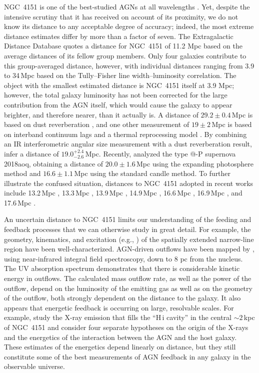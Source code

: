 \documentclass[twocolumn]{aastex63}
\makeatletter
\renewcommand{\ng}{NGC\ 4151 }
\newcommand*{\rom}[1]{\expandafter\@slowromancap\romannumeral #1@}
\makeatother
\begin{document}
\ng is  one of the best-studied AGNs at all wavelengths \citep[e.g.,][]{Ulrich2000}. Yet, despite the intensive scrutiny that it has received on account of its proximity, we do not know its distance to any acceptable degree of accuracy; indeed, the most extreme distance estimates differ by more than a factor of seven. The Extragalactic Distance Database \citep{Tully2009} quotes a distance for \ng of 11.2 Mpc based on the average distances of its fellow group members. Only four galaxies contribute to this group-averaged distance, however, with individual distances ranging from 3.9 to 34\,Mpc based on the Tully--Fisher line width--luminosity correlation. The object with the smallest estimated distance is \ng itself at 3.9 Mpc; however, the total galaxy luminosity has not been corrected for the large contribution from the AGN itself, which would cause the galaxy to appear brighter, and therefore nearer, than it actually is. A distance of $29.2 \pm 0.4$\,Mpc is based on dust reverberation \citep{Yoshii2014}, and one other measurement of $19 \pm 2$\,Mpc is based on interband continuum lags and a thermal reprocessing model \citep{Cackett2007}. By combining an IR interferometric angular size measurement with a dust reverberation result, \cite{Hoenig2014} infer a distance of $19.0^{+2.4}_{-2.6}$\,Mpc. Recently, \citet{2019MNRAS.487.3001T} analyzed the type \rom{2}-P supernova 2018aoq, obtaining a distance of $20.0\pm1.6$\,Mpc using the expanding photosphere method and $16.6\pm1.1$\,Mpc using the standard candle method. To further illustrate the confused situation, distances to \ng adopted in recent works include 13.2\,Mpc \citep{Hicks2008}, 13.3\,Mpc \citep{Storchi-Bergmann2010, Iserlohe2013}, 13.9\,Mpc \citep{Onken2014,DeRosa2018}, 14.9\,Mpc \citep{Esquej2014}, 16.6\,Mpc \citep{Bentz2013}, 16.9\,Mpc \citep{Burtscher2013}, and 17.6\,Mpc \citep{Kishimoto2011}.

An uncertain distance to \ng limits our understanding of the feeding and feedback processes that we can otherwise study in great detail. For example, the geometry, kinematics, and excitation (e.g., \citealt{Winge1999, Das2005, Shimono2010, Storchi-Bergmann2009}) of the spatially extended narrow-line region have been well-characterized. AGN-driven outflows have been mapped by \cite{Storchi-Bergmann2010}, using near-infrared integral field spectroscopy, down to 8 pc from the nucleus. The UV absorption spectrum \citep[e.g.,][]{Crenshaw2007} demonstrates that there is considerable kinetic energy in outflows. The calculated mass outflow rate, as well as the power of the outflow, depend on the luminosity of the emitting gas as well as on the geometry of the outflow, both strongly dependent on the distance to the galaxy. It also appears that energetic feedback is occurring on large, resolvable scales. For example, \cite{Wang2010} study the X-ray emission that fills the ``H\,{\sc i} cavity'' in the central $\sim2$\,kpc of \ng and consider four separate hypotheses on the origin of the X-rays and the energetics of the interaction between the AGN and the host galaxy. These estimates of the energetics depend linearly on distance, but they still constitute some of the best measurements of AGN feedback in any galaxy in the observable universe.
\end{document}
